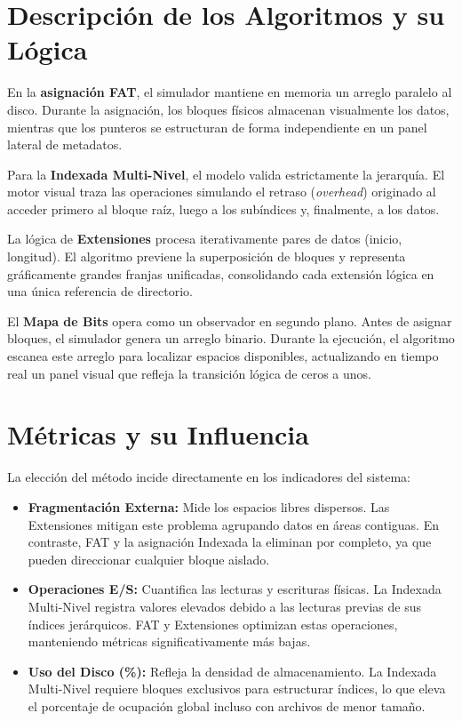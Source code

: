 \documentclass[12pt,a4paper]{article}
\begin{document}
\section{Descripción de los Algoritmos y su Lógica}
En la \textbf{asignación FAT}, el simulador mantiene en memoria un arreglo paralelo al disco. Durante la asignación, los bloques físicos almacenan visualmente los datos, mientras que los punteros se estructuran de forma independiente en un panel lateral de metadatos.

Para la \textbf{Indexada Multi-Nivel}, el modelo valida estrictamente la jerarquía. El motor visual traza las operaciones simulando el retraso (\textit{overhead}) originado al acceder primero al bloque raíz, luego a los subíndices y, finalmente, a los datos.

La lógica de \textbf{Extensiones} procesa iterativamente pares de datos (inicio, longitud). El algoritmo previene la superposición de bloques y representa gráficamente grandes franjas unificadas, consolidando cada extensión lógica en una única referencia de directorio.

El \textbf{Mapa de Bits} opera como un observador en segundo plano. Antes de asignar bloques, el simulador genera un arreglo binario. Durante la ejecución, el algoritmo escanea este arreglo para localizar espacios disponibles, actualizando en tiempo real un panel visual que refleja la transición lógica de ceros a unos.

\section{Métricas y su Influencia}
La elección del método incide directamente en los indicadores del sistema:

\begin{itemize}
    \item \textbf{Fragmentación Externa:} Mide los espacios libres dispersos. Las Extensiones mitigan este problema agrupando datos en áreas contiguas. En contraste, FAT y la asignación Indexada la eliminan por completo, ya que pueden direccionar cualquier bloque aislado.
    \item \textbf{Operaciones E/S:} Cuantifica las lecturas y escrituras físicas. La Indexada Multi-Nivel registra valores elevados debido a las lecturas previas de sus índices jerárquicos. FAT y Extensiones optimizan estas operaciones, manteniendo métricas significativamente más bajas.
    \item \textbf{Uso del Disco (\%):} Refleja la densidad de almacenamiento. La Indexada Multi-Nivel requiere bloques exclusivos para estructurar índices, lo que eleva el porcentaje de ocupación global incluso con archivos de menor tamaño.
\end{itemize}
\end{document}
